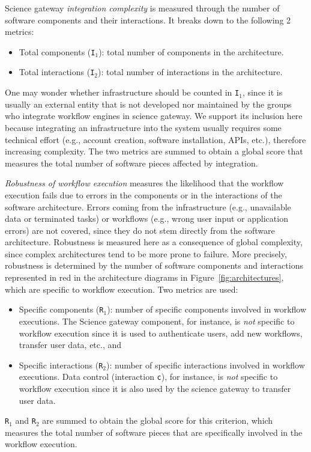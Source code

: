 \documentclass[preprint,3p,twocolumn]{elsarticle}
\begin{document}
Science gateway \emph{integration complexity} is measured through the number of software components and their interactions. It breaks
down to the following 2 metrics:
\begin{itemize}[leftmargin=0cm,itemindent=0.35cm,itemsep=0cm]
\item Total components (\texttt{I$_1$}): total number of components in
  the architecture.
\item Total interactions (\texttt{I$_2$}): total number of
  interactions in the architecture.
\end{itemize}
One may wonder whether infrastructure should be counted in
\texttt{I$_1$}, since it is usually an external entity that is not developed nor maintained by the groups who
integrate workflow engines in science gateway. We support its inclusion here because integrating an
infrastructure into the system usually requires some technical
effort (e.g., account creation, software installation, APIs, etc.), therefore increasing complexity. The two metrics are summed to obtain a
global score that measures the
total number of software pieces affected by integration. 

\emph{Robustness of workflow execution} measures the likelihood that the
workflow execution fails due to errors in the components or in the
interactions of the software architecture. Errors coming
from the infrastructure (e.g., unavailable data or terminated tasks)
or workflows (e.g., wrong user input or application errors) are not
covered, since they do not stem directly from the software
architecture. Robustness is measured here as a consequence of global
complexity, since complex architectures tend to be more prone to
failure. More precisely, robustness is determined by the number of
software components and interactions represented in
red in the architecture diagrams in
Figure~\ref{fig:architectures}, which are specific to workflow
execution. Two metrics are used:
\begin{itemize}[leftmargin=0cm,itemindent=0.35cm,itemsep=0cm]
\item Specific components  (\texttt{R$_1$}): number of specific components
involved in workflow executions. The Science
gateway component, for instance, is \emph{not} specific to workflow execution
since it is used to authenticate users, add new workflows, transfer
user data, etc., and
\item Specific interactions (\texttt{R$_2$}): number of specific
  interactions involved in workflow executions. Data control
  (interaction \texttt{c}), for instance, is \emph{not} specific to
  workflow execution since it is also used by the science gateway to
  transfer user data. 
\end{itemize}
\texttt{R$_1$} and \texttt{R$_2$} are
summed to obtain the global score for this criterion, which measures
the total number of software pieces that are specifically involved in
the workflow execution.
\end{document}
